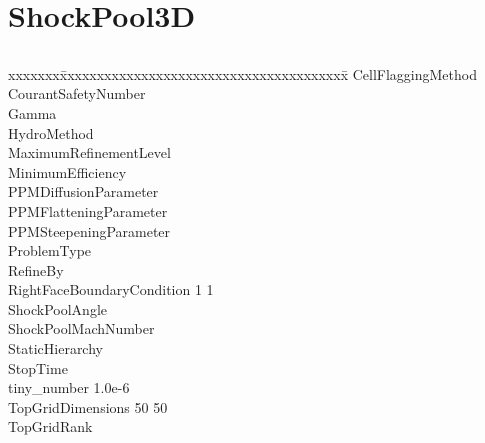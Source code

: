 \documentclass{book}
\begin{document}
\subsection{\cello}

\section{ShockPool3D} \label{s:ShockPool3D}

\subsection{\enzo}

{\parametersize
\begin{tabbing}
xxxxxxx\=xxxxxxxxxxxxxxxxxxxxxxxxxxxxxxxxxxxxxxx\=\kill
\> CellFlaggingMethod         \\
\> CourantSafetyNumber     \\
\> Gamma                   \\
\> HydroMethod             \\
\> MaximumRefinementLevel     \\
\> MinimumEfficiency          \\
\> PPMDiffusionParameter          \\
\> PPMFlatteningParameter         \\
\> PPMSteepeningParameter         \\
\> ProblemType                     \\
\> RefineBy                       \\
\> RightFaceBoundaryCondition  1 1   \\
\> ShockPoolAngle               \\
\> ShockPoolMachNumber       \\
\> StaticHierarchy                \\
\> StopTime                \\
\> tiny\_number            \> 1.0e-6   \\
\> TopGridDimensions       50 50 \\
\> TopGridRank            
\end{tabbing}}
\end{document}
